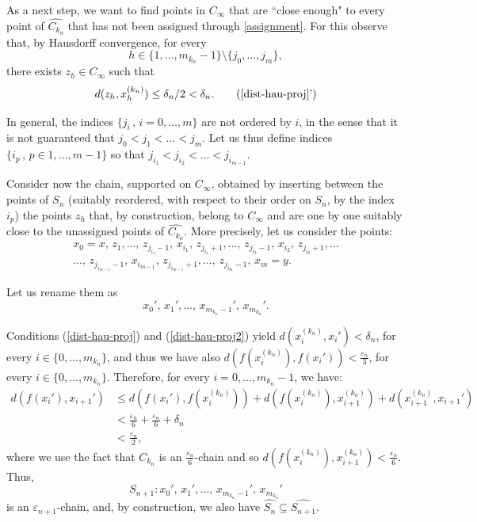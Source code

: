 \documentclass[10pt,a4paper]{article}
\theoremstyle{definition}
\theoremstyle{remark}
\theoremstyle{plain}
\begin{document}
    As a next step, we want to find points in $C_\infty$ that are ``close enough" to every point of $\widehat{C_{k_n}}$ that has not been assigned through \eqref{assignment}. For this observe that, by Hausdorff convergence, for every $$h\in\{1,\dots,m_{k_n}-1\}\setminus\{j_0,\dots,j_m\},$$ there exists $z_h\in C_\infty$ such that
    \begin{equation}
        d(z_h,x_h^{(k_n)})\leq\delta_n/2<\delta_n.
        \tag{\ref{dist-hau-proj}'}
        \label{dist-hau-proj2}
    \end{equation}

    In general, the indices $\{j_i\, ,\, i=0,\dots, m\}$ are not ordered by $i$, in the sense that it is not guaranteed that $j_0<j_1<\dots<j_m$. Let us thus define indices $\{i_p\, ,\, p\in 1,\dots, m-1\}$ so that $j_{i_1}<j_{i_2}<\dots<j_{i_{m-1}}$.
    
    Consider now the chain, supported on $C_\infty$, obtained by inserting between the points of $S_n$ (suitably reordered, with respect to their order on $S_n$, by the index $i_p$) the points $z_h$ that, by construction, belong to $C_\infty$ and are one by one suitably close to the unassigned points of $\widehat{C_{k_n}}$. More precisely, let us consider the points:
    \begin{multline*}
        x_0=x,\,z_1,\dots,\,z_{j_{i_1}-1},\,x_{i_1},\,z_{j_{i_1}+1},\dots,\,z_{j_{i_2}-1},\,x_{i_2},\,z_{j_{i_2}+1},\dots\\\dots,\,z_{j_{i_{m-1}}-1},\,x_{i_{m-1}},\,z_{j_{i_{m-1}}+1},\dots,\,z_{j_{i_m}-1},\,x_m=y.
    \end{multline*}
    
    Let us rename them as
    $$x_0',\,x_1',\dots,\,x_{m_{k_n}-1}',\,x_{m_{k_n}}'.$$

    
    Conditions (\ref{dist-hau-proj}) and (\ref{dist-hau-proj2}) yield $d(x_i^{(k_n)},x_i')<\delta_n$, for every $i\in\{0,\dots,m_{k_n}\}$, and thus we have also $d(f(x_i^{(k_n)}),f(x_i'))<\frac{\varepsilon_n}{3}$, for every $i\in\{0,\dots,m_{k_n}\}$.
    Therefore, for every $i=0,\dots,m_{k_n}-1$, we have:
    \begin{align*}
        d(f(x_i'), x_{i+1}') &\le d(f(x_i'), f(x_i^{(k_n)})) + d(f(x_i^{(k_n)}), x_{i+1}^{(k_n)}) + d(x_{i+1}^{(k_n)}, x_{i+1}') \\
        &< \frac{\varepsilon_n}{6} + \frac{\varepsilon_n}{6} + \delta_n \\
        &< \frac{\varepsilon_n}{2},
    \end{align*}
    where we use the fact that $C_{k_n}$ is an $\frac{\varepsilon_n}{6}$-chain and so $d(f(x_i^{(k_n)}), x_{i+1}^{(k_n)})<\frac{\varepsilon_n}{6}$.
    Thus,
    $$S_{n+1}:x_0',\,x_1',\dots,\,x_{m_{k_n}-1}',\,x_{m_{k_n}}'$$
    is an $\varepsilon_{n+1}$-chain, and, by construction, we also have
    $\widehat{S_n}\subseteq \widehat{S_{n+1}}$.
\end{document}
